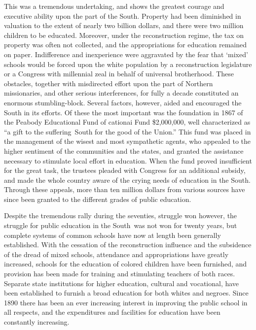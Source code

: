\documentclass[]{book}
\begin{document}
This was a tremendous undertaking, and shows the greatest courage and executive ability upon the part of the South. Property had been diminished in valuation to the extent of nearly two billion dollars, and there were two million children to be educated. Moreover, under the reconstruction regime, the tax on property was often not collected, and the appropriations for education remained on paper. Indifference and inexperience were aggravated by the fear that `mixed' schools would be forced upon the white population by a reconstruction legislature or a Congress with millennial zeal in behalf of universal brotherhood. These obstacles, together with misdirected effort upon the part of Northern missionaries, and other serious interferences, for fully a decade constituted an enormous stumbling-block. Several factors, however, aided and encouraged the South in its efforts. Of these the most important was the foundation in 1867 of the Peabody Educational Fund of cationai Fund \$2,000,000, well characterized as ``a gift to the suffering~South for the good of the Union.'' This fund was placed in the management of the wisest and most sympathetic agents, who appealed to the higher sentiment of the communities and the states, and granted the assistance necessary to stimulate local effort in education. When the fund proved insufficient for the great task, the trustees pleaded with Congress for an additional subsidy, and made the whole country aware of the crying needs of education in the South. Through these appeals, more than ten million dollars from various sources have since been granted to the different grades of public education.

Despite the tremendous rally during the seventies, struggle won however, the struggle for public education in the South~was not won for twenty years, but complete systems of common schools have now at length been generally established. With the cessation of the reconstruction influence and the subsidence of the dread of mixed schools, attendance and appropriations have greatly increased, schools for the education of colored children have been furnished, and provision has been made for training and stimulating teachers of both races. Separate state institutions for higher education, cultural and vocational, have been established to furnish a broad education for both whites and negroes. Since 1890 there has been an ever increasing interest in improving the public school in all respects, and the expenditures and facilities for education have been constantly increasing.
\end{document}
